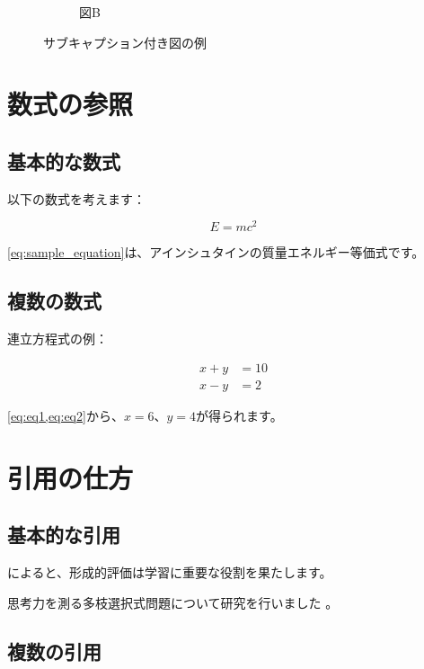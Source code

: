 \documentclass[../main/main.tex]{subfiles}
\begin{document}
\begin{figure}[htbp]
\begin{subfigure}[b]{0.45\textwidth}
        \caption{図B}
        \label{fig:subplot_b}
    \end{subfigure}
    \caption{サブキャプション付き図の例}
    \label{fig:subplots}
\end{figure}

\section{数式の参照}

\subsection{基本的な数式}

以下の数式を考えます：

\begin{equation}
    E = mc^2
    \label{eq:sample_equation}
\end{equation}

\cref{eq:sample_equation}は、アインシュタインの質量エネルギー等価式です。

\subsection{複数の数式}

連立方程式の例：

\begin{align}
    x + y &= 10 \label{eq:eq1} \\
    x - y &= 2 \label{eq:eq2}
\end{align}

\cref{eq:eq1,eq:eq2}から、$x = 6$、$y = 4$が得られます。

\section{引用の仕方}
\subsection{基本的な引用}

\textcite{Black1998-yt}によると、形成的評価は学習に重要な役割を果たします。

思考力を測る多枝選択式問題について研究を行いました \parencite{arai2020japanese}。

\subsection{複数の引用}
\end{document}
